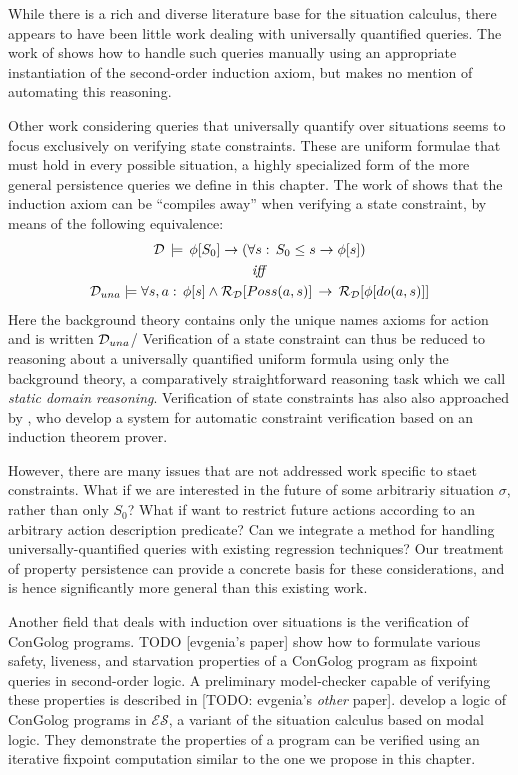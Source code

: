 While there is a rich and diverse literature base for the situation
calculus, there appears to have been little work dealing with universally
quantified queries. The work of \citet{Reiter93proving} shows how
to handle such queries manually using an appropriate instantiation
of the second-order induction axiom, but makes no mention of automating
this reasoning.

Other work considering queries that universally quantify over situations
seems to focus exclusively on verifying state constraints. These are
uniform formulae that must hold in every possible situation, a highly
specialized form of the more general persistence queries we define
in this chapter. The work of \citet{Lin94-StateConstraints} shows
that the induction axiom can be {}``compiles away'' when verifying
a state constraint, by means of the following equivalence:\begin{gather*}
\mathcal{D}\,\models\,\phi[S_{0}]\rightarrow\left(\forall s:\, S_{0}\leq s\rightarrow\phi[s]\right)\\
\mathit{iff}\\
\mathcal{D}_{una}\models\forall s,a:\,\phi[s]\wedge\mathcal{R}_{\mathcal{D}}[Poss(a,s)]\,\rightarrow\,\mathcal{R}_{\mathcal{D}}[\phi[do(a,s)]]\end{gather*}
 Here the background theory contains only the unique names axioms
for action and is written $\mathcal{D}_{una}$/ Verification of a state constraint
can thus be reduced to reasoning about a universally quantified uniform
formula using only the background theory, a comparatively straightforward
reasoning task which we call \emph{static domain reasoning}. Verification
of state constraints has also also approached by \citet{bertossi96automating},
who develop a system for automatic constraint verification based on
an induction theorem prover.

However, there are many issues that are not addressed work specific
to staet constraints. What if we are interested in the future of some
arbitrariy situation $\sigma$, rather than only $S_{0}$? What if
want to restrict future actions according to an arbitrary action description
predicate? Can we integrate a method for handling universally-quantified
queries with existing regression techniques? Our treatment of property
persistence can provide a concrete basis for these considerations,
and is hence significantly more general than this existing work.

Another field that deals with induction over situations is the verification
of ConGolog programs. TODO {[}evgenia's paper] show how to formulate
various safety, liveness, and starvation properties of a ConGolog
program as fixpoint queries in second-order logic. A preliminary model-checker
capable of verifying these properties is described in {[}TODO: evgenia's
\emph{other} paper]. \citet{classen08golog_properties} develop a
logic of ConGolog programs in $\mathcal{ES}$, a variant of the situation
calculus based on modal logic. They demonstrate the properties of
a program can be verified using an iterative fixpoint computation
similar to the one we propose in this chapter.


